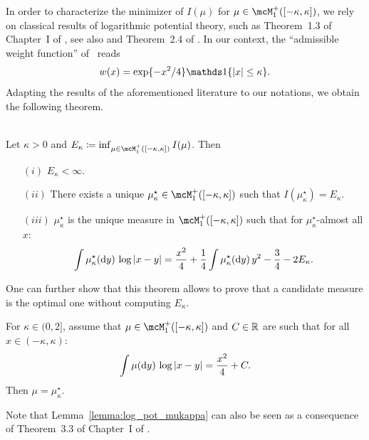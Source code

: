  \myskip 
In order to characterize the minimizer of $I(\mu)$ for $\mu \in \mcM_1^+([-\kappa,\kappa])$, we
rely on classical results of logarithmic potential theory, such as Theorem~1.3 of Chapter~I of \cite{saff2013logarithmic}, see also \cite{mhaskar1985does} and Theorem~2.4 of \cite{arous1997large}.
In our context, the ``admissible weight function'' of~\cite{saff2013logarithmic} reads
\begin{equation*}
    w(x) = \exp\{-x^2/4\} \indi\{|x| \leq \kappa\}.
\end{equation*}
Adapting the results of the aforementioned literature to our notations, we obtain the following theorem.
\begin{theorem}
    \label{thm:properties_inf_I}
    ~\\
    Let $\kappa > 0$ and
    $E_\kappa \coloneqq \inf_{\mu \in \mcM_1^+([-\kappa,\kappa])} I(\mu)$. Then
    \begin{itemize}
        \item[$(i)$] $E_\kappa < \infty$.
        \item[$(ii)$] There exists a unique $\mu_\kappa^\star \in \mcM_1^+([-\kappa,\kappa])$ such that $I(\mu_\kappa^\star) = E_\kappa$.
        \item[$(iii)$] $\mu_\kappa^\star$ is the unique measure in $\mcM_1^+([-\kappa,\kappa])$ such that for $\mu_\kappa^\star$-almost all $x$: 
        \begin{equation*}
            \int \mu_\kappa^\star(\mathrm{d} y) \, \log |x - y| = \frac{x^2}{4} + \frac{1}{4} \int \mu_\kappa^\star(\mathrm{d} y) \, y^2 - \frac{3}{4} - 2 E_\kappa.
        \end{equation*}
    \end{itemize} 
\end{theorem}
\noindent
One can further show that this theorem allows to prove that a candidate measure is the optimal one without computing $E_\kappa$.
\begin{lemma}\label{lemma:log_pot_mukappa}
    For $\kappa \in (0,2]$, assume that $\mu \in \mcM_1^+([-\kappa,\kappa])$ and $C \in \mathbb{R}$ are such that for all $x \in (-\kappa,\kappa)$:
    \begin{equation}\label{eq:log_pot_mukappa_hyp}
        \int \mu(\mathrm{d} y) \, \log |x - y| = \frac{x^2}{4} + C.
    \end{equation}
    Then $\mu = \mu_\kappa^\star$.
\end{lemma}
\noindent
Note that Lemma~\ref{lemma:log_pot_mukappa} can also be seen as a consequence of Theorem~3.3 of Chapter~I of \cite{saff2013logarithmic}. 
